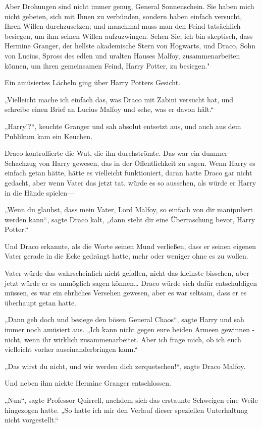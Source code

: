 {Aber Drohungen sind nicht immer genug, General Sonnenschein. Sie haben mich nicht gebeten, sich mit Ihnen zu verbünden, sondern haben einfach versucht, Ihren Willen durchzusetzen; und manchmal muss man den Feind tatsächlich besiegen, um ihm seinen Willen aufzuzwingen. Sehen Sie, ich bin skeptisch, dass Hermine Granger, der hellste akademische Stern von Hogwarts, und Draco, Sohn von Lucius, Spross des edlen und uralten Hauses Malfoy, zusammenarbeiten können, um ihren gemeinsamen Feind, Harry Potter, zu besiegen."

Ein amüsiertes Lächeln ging über Harry Potters Gesicht.

„Vielleicht mache ich einfach das, was Draco mit Zabini versucht hat, und schreibe einen Brief an Lucius Malfoy und sehe, was er davon hält.“

„Harry!?“, keuchte Granger und sah absolut entsetzt aus, und auch aus dem Publikum kam ein Keuchen.

Draco kontrollierte die Wut, die ihn durchströmte. Das war ein dummer Schachzug von Harry gewesen, das in der Öffentlichkeit zu sagen. Wenn Harry es einfach getan hätte, hätte es vielleicht funktioniert, daran hatte Draco gar nicht gedacht, aber wenn Vater das jetzt tat, würde es so aussehen, als würde er Harry in die Hände spielen—

„Wenn du glaubst, dass mein Vater, Lord Malfoy, so einfach von dir manipuliert werden kann“, sagte Draco kalt, „dann steht dir eine Überraschung bevor, Harry Potter.“

Und Draco erkannte, als die Worte seinen Mund verließen, dass er seinen eigenen Vater gerade in die Ecke gedrängt hatte, mehr oder weniger ohne es zu wollen.

Vater würde das wahrscheinlich nicht gefallen, nicht das kleinste bisschen, aber jetzt würde er es unmöglich sagen können… Draco würde sich dafür entschuldigen müssen, es war ein ehrliches Versehen gewesen, aber es war seltsam, dass er es überhaupt getan hatte.

„Dann geh doch und besiege den bösen General Chaos“, sagte Harry und sah immer noch amüsiert aus. „Ich kann nicht gegen eure beiden Armeen gewinnen - nicht, wenn ihr wirklich zusammenarbeitet. Aber ich frage mich, ob ich euch vielleicht vorher auseinanderbringen kann.“

„Das wirst du nicht, und wir werden dich zerquetschen!“, sagte Draco Malfoy.

Und neben ihm nickte Hermine Granger entschlossen.

„Nun“, sagte Professor Quirrell, nachdem sich das erstaunte Schweigen eine Weile hingezogen hatte. „So hatte ich mir den Verlauf dieser speziellen Unterhaltung nicht vorgestellt.“

}
